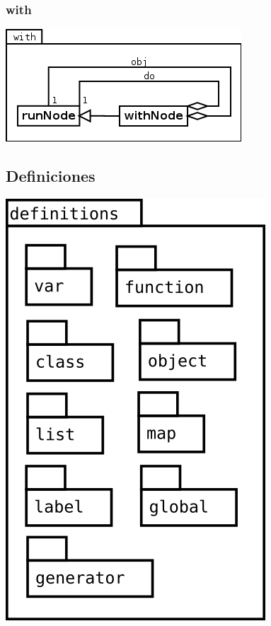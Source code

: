 \subsubsection{with}
\begin{center}
\includegraphics[scale=0.4]{with.png} \\
\end{center}
\pagebreak
\subsection {Definiciones}
\begin{center}
\includegraphics[scale=0.4]{definitions.png} \\
\end{center}

